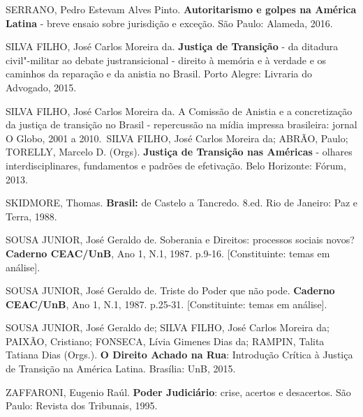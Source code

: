 SERRANO, Pedro Estevam Alves Pinto. \textbf{Autoritarismo e golpes na
América Latina} - breve ensaio sobre jurisdição e exceção. São Paulo:
Alameda, 2016.

SILVA FILHO, José Carlos Moreira da. \textbf{Justiça de Transição} - da
ditadura civil"-militar ao debate justransicional - direito à memória e à
verdade e os caminhos da reparação e da anistia no Brasil. Porto Alegre:
Livraria do Advogado, 2015.

SILVA FILHO, José Carlos Moreira da. A Comissão de Anistia e a
concretização da justiça de transição no Brasil - repercussão na mídia
impressa brasileira: jornal O Globo, 2001 a 2010.~SILVA FILHO, José
Carlos Moreira da; ABRÃO, Paulo; TORELLY, Marcelo D. (Orgs).
\textbf{Justiça de Transição nas Américas} - olhares interdisciplinares,
fundamentos e padrões de efetivação. Belo Horizonte: Fórum, 2013.

SKIDMORE, Thomas. \textbf{Brasil:} de Castelo a Tancredo. 8.ed. Rio de
Janeiro: Paz e Terra, 1988.

SOUSA JUNIOR, José Geraldo de. Soberania e Direitos: processos sociais
novos? \textbf{Caderno CEAC/UnB}, Ano 1, N.1, 1987. p.9-16.
{[}Constituinte: temas em análise{]}.

SOUSA JUNIOR, José Geraldo de. Triste do Poder que não pode.
\textbf{Caderno CEAC/UnB}, Ano 1, N.1, 1987. p.25-31. {[}Constituinte:
temas em análise{]}.

SOUSA JUNIOR, José Geraldo de; SILVA FILHO, José Carlos Moreira da;
PAIXÃO, Cristiano; FONSECA, Lívia Gimenes Dias da; RAMPIN, Talita
Tatiana Dias (Orgs.). \textbf{O Direito Achado na Rua}: Introdução
Crítica à Justiça de Transição na América Latina. Brasília: UnB, 2015.

ZAFFARONI, Eugenio Raúl. \textbf{Poder Judiciário}: crise, acertos e
desacertos. São Paulo: Revista dos Tribunais, 1995.
